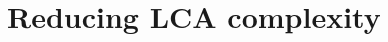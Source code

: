 \documentclass[10pt,journal,draftclsnofoot,onecolumn]{IEEEtran}
\renewcommand\vec[1]{\boldsymbol{#1}}
\newcommand\1{\vec 1}
\begin{document}
% 
% 
% 





\appendices

\section{Reducing LCA complexity}\label{sec:reducing_lca_complexity}

\renewcommand\b{\vec b}
\end{document}
